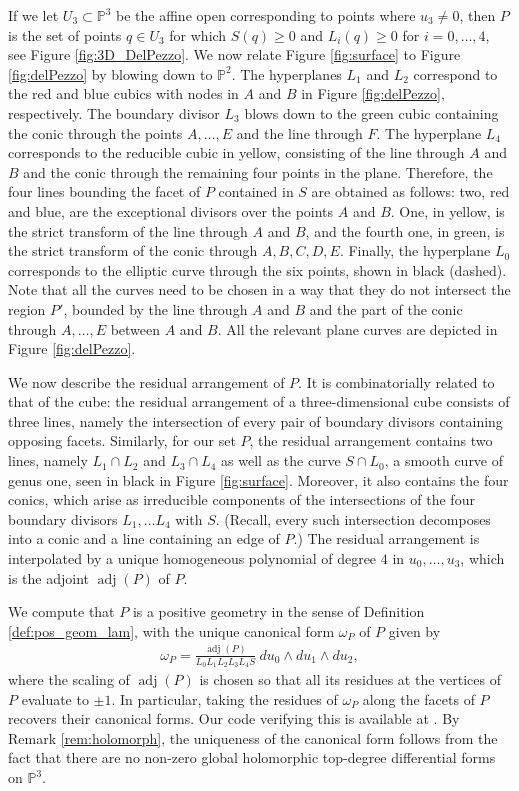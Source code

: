 \documentclass[12pt]{extarticle}
\theoremstyle{definition}
\theoremstyle{theorem}
\theoremstyle{remark}
\numberwithin{equation}{section}
\newcommand{\PP}{\mathbb{P}}
\begin{document}
If we let $U_3\subset \PP^3$ be the affine open corresponding to points where $u_3\neq 0$, then $P$ is the set of points $q\in U_3$ for which $S(q)\geq 0$ and  $L_i(q)\geq 0$ for $i=0,\ldots,4$, see Figure \ref{fig:3D_DelPezzo}.
We now relate Figure \ref{fig:surface} to Figure \ref{fig:delPezzo} by blowing down to $\PP^2$.
The hyperplanes $L_1$ and $L_2$ correspond to the red and blue cubics with nodes in $A$ and $B$ in Figure \ref{fig:delPezzo}, respectively.
The boundary divisor $L_3$ blows down to the green cubic containing the conic through the points $A,\ldots,E$ and the line through $F$.
The hyperplane $L_4$ corresponds to the reducible cubic in yellow, consisting of the line through $A$ and $B$ and the conic through the remaining four points in the plane.
Therefore, the four lines bounding the facet of $P$ contained in $S$ are obtained as follows: two, red and blue, are the exceptional divisors over the points $A$ and $B$. One, in yellow, is the strict transform of the line through $A$ and $B$, and the fourth one, in green, is the strict transform of the conic through $A,B,C,D,E$.
Finally, the hyperplane $L_0$ corresponds to the elliptic curve through the six points, shown in black (dashed).
Note that all the curves need to be chosen in a way that they do not intersect the region $P'$, bounded by the line through $A$ and $B$ and the part of the conic through $A,\ldots,E$ between $A$ and $B$.
All the relevant plane curves are depicted in Figure \ref{fig:delPezzo}.

We now describe the residual arrangement of $P$. It is combinatorially related to that of the cube: the residual arrangement of a three-dimensional cube consists of three lines, namely the intersection of every pair of boundary divisors containing opposing facets. Similarly, for our set $P$, the residual arrangement  contains two lines, namely $L_1\cap L_2$ and $L_3\cap L_4$ as well as the curve $S\cap L_0$, a smooth curve of genus one, seen in black in Figure \ref{fig:surface}.
Moreover, it also contains the four conics, which arise as irreducible components of the intersections of the four boundary divisors $L_1,\ldots L_4$ with $S$. (Recall, every such intersection decomposes into a conic and a line containing an edge of $P$.)
The residual arrangement is interpolated by a unique homogeneous polynomial of degree $4$ in $u_0,\ldots,u_3$, which is the adjoint $\operatorname{adj}(P)$ of $P$.

We compute that $P$ is a positive geometry in the sense of Definition \ref{def:pos_geom_lam}, with the unique canonical form $\omega_P$ of $P$ given by
\begin{align}
    \omega_P=\frac{\operatorname{adj}(P)}{L_0L_1L_2L_3L_4S}\:  du_0\wedge du_1 \wedge du_2,
\end{align}
where the scaling of $\operatorname{adj}(P)$ is chosen so that all its residues at the vertices of $P$ evaluate to $\pm 1$. In particular, taking the residues of $\omega_P$ along the facets of $P$ recovers their canonical forms. Our code verifying this is available at \cite{zenodo}. By Remark \ref{rem:holomorph}, the uniqueness of the canonical form follows from the fact that there are no non-zero global holomorphic top-degree differential forms on $\mathbb{P}^3$.
\end{document}
